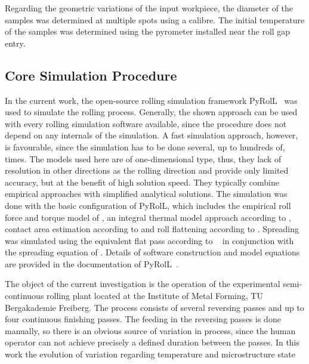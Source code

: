 Regarding the geometric variations of the input workpiece, the diameter of the samples was determined at multiple spots using a calibre.
The initial temperature of the samples was determined using the pyrometer installed near the roll gap entry.

\subsection{Core Simulation Procedure}\label{subsec:simulation-procedure}

In the current work, the open-source rolling simulation framework PyRolL~\cite{pyroll2} was used to simulate the rolling process.
Generally, the shown approach can be used with every rolling simulation software available, since the procedure does not depend on any internals of the simulation.
A fast simulation approach, however, is favourable, since the simulation has to be done several, up to hundreds of, times.
The models used here are of one-dimensional type, thus, they lack of resolution in other directions as the rolling direction and provide only limited accuracy, but at the benefit of high solution speed.
They typically combine empirical approaches with simplified analytical solutions.
The simulation was done with the basic configuration of PyRolL, which includes the empirical roll force and torque model of \textcite{Hensel1978}, an integral thermal model approach according to \textcite{Hensel1990}, contact area estimation according to \textcite{Zouhar1960} and roll flattening according to \textcite{Hitchcock1935}.
Spreading was simulated using the equivalent flat pass according to \citeauthor*{Lendl1948}~\cite{Lendl1948, Lendl1948a, Lendl1949} in conjunction with the spreading equation of \textcite{Wusatowski1969}.
Details of software construction and model equations are provided in the documentation of PyRolL~\cite{pyroll}.

The object of the current investigation is the operation of the experimental semi-continuous rolling plant located at the Institute of Metal Forming, TU Bergakademie Freiberg.
The process consists of several reversing passes and up to four continuous finishing passes.
The feeding in the reversing passes is done manually, so there is an obvious source of variation in process, since the human operator can not achieve precisely a defined duration between the passes.
In this work the evolution of variation regarding temperature and microstructure state


